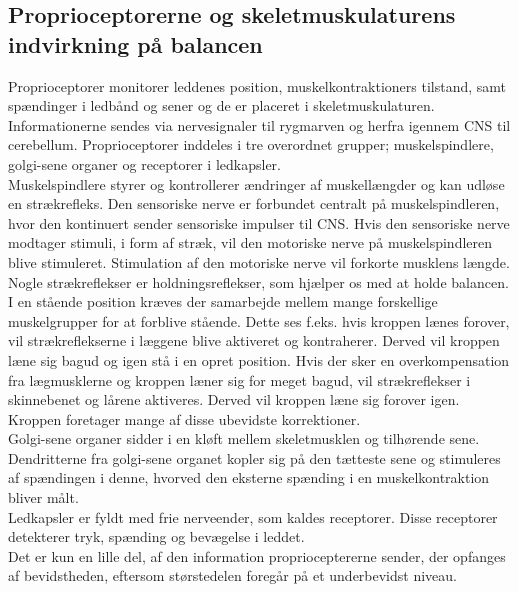 \subsection{Proprioceptorerne og skeletmuskulaturens indvirkning på balancen}
Proprioceptorer monitorer leddenes position, muskelkontraktioners tilstand, samt spændinger i ledbånd og sener og de er placeret i skeletmuskulaturen. Informationerne sendes via nervesignaler til rygmarven og herfra igennem CNS til cerebellum. Proprioceptorer inddeles i tre overordnet grupper; muskelspindlere, golgi-sene organer og receptorer i ledkapsler.\cite{Martini2012}    \\
Muskelspindlere styrer og kontrollerer ændringer af muskellængder og kan udløse en strækrefleks. Den sensoriske nerve er forbundet centralt på muskelspindleren, hvor den kontinuert sender sensoriske impulser til CNS. Hvis den sensoriske nerve modtager stimuli, i form af stræk, vil den motoriske nerve på muskelspindleren blive stimuleret. Stimulation af den motoriske nerve vil forkorte musklens længde. Nogle strækreflekser er holdningsreflekser, som hjælper os med at holde balancen. I en stående position kræves der samarbejde mellem mange forskellige muskelgrupper for at forblive stående. Dette ses f.eks. hvis kroppen lænes forover, vil strækreflekserne i læggene blive aktiveret og kontraherer. Derved vil kroppen læne sig bagud og igen stå i en opret position. Hvis der sker en overkompensation fra lægmusklerne og kroppen læner sig for meget bagud, vil strækreflekser i skinnebenet og lårene aktiveres. Derved vil kroppen læne sig forover igen. Kroppen foretager mange af disse ubevidste korrektioner. \cite{Martini2012}   \\ %

Golgi-sene organer sidder i en kløft mellem skeletmusklen og tilhørende sene. Dendritterne fra golgi-sene organet kopler sig på den tætteste sene og stimuleres af spændingen i denne, hvorved den eksterne spænding i en muskelkontraktion bliver målt. \cite{Martini2012}    \\

Ledkapsler er fyldt med frie nerveender, som kaldes receptorer. Disse receptorer detekterer tryk, spænding og bevægelse i leddet. \cite{Martini2012}    \\

Det er kun en lille del, af den information proprioceptererne sender, der opfanges af bevidstheden, eftersom størstedelen foregår på et underbevidst niveau.\cite{Martini2012}   

